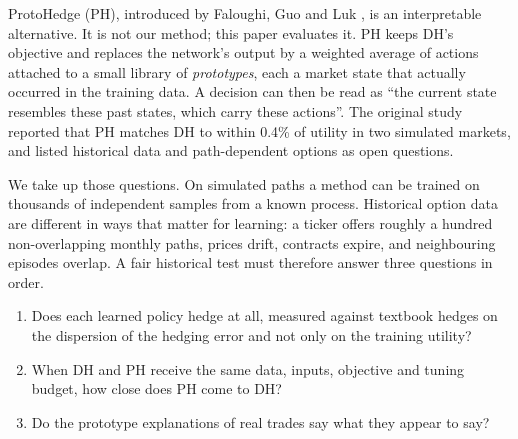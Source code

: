 \documentclass[10pt,conference]{IEEEtran}
\newcommand{\PH}{ProtoHedge}
\begin{document}
\PH{} (PH), introduced by Faloughi, Guo and Luk
\cite{faloughi2025protohedge}, is an interpretable alternative. It is not our
method; this paper evaluates it. PH keeps DH's objective and replaces the
network's output by a weighted average of actions attached to a small library
of \emph{prototypes}, each a market state that actually occurred in the
training data. A decision can then be read as ``the current state resembles
these past states, which carry these actions''. The original study reported
that PH matches DH to within 0.4\% of utility in two simulated markets, and
listed historical data and path-dependent options as open questions.

We take up those questions. On simulated paths a method can be trained on
thousands of independent samples from a known process. Historical option data
are different in ways that matter for learning: a ticker offers roughly a
hundred non-overlapping monthly paths, prices drift, contracts expire, and
neighbouring episodes overlap. A fair historical test must therefore answer
three questions in order.
\begin{enumerate}
\item Does each learned policy hedge at all, measured against textbook hedges
on the dispersion of the hedging error and not only on the training utility?
\item When DH and PH receive the same data, inputs, objective and tuning
budget, how close does PH come to DH?
\item Do the prototype explanations of real trades say what they appear to
say?
\end{enumerate}
\end{document}
